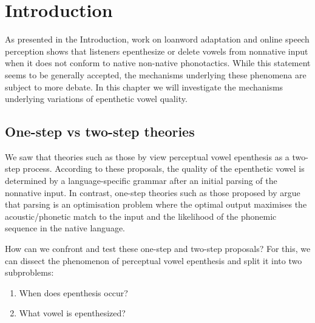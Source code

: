 

\section{Introduction}
As presented in the Introduction, work on loanword adaptation and online speech perception shows that listeners epenthesize or delete vowels from nonnative input when it does not conform to native non-native phonotactics.
While this statement seems to be generally accepted, the mechanisms underlying these phenomena are subject to more debate. In this chapter we will investigate the mechanisms underlying variations of epenthetic vowel quality. 


\subsection{One-step vs two-step theories}

We saw that theories such as those by \cite{berent2007, monahan2009} view perceptual vowel epenthesis as a two-step process.
According to these proposals, the quality of the epenthetic vowel is determined by a language-specific grammar after an initial parsing of the nonnative input.
In contrast, one-step theories such as those proposed by \cite{dupoux2011, wilson2013, durvasula2015} argue that parsing is an optimisation problem where the optimal output maximises the acoustic/phonetic match to the input and the likelihood of the phonemic sequence in the native language. 

How can we confront and test these one-step and two-step proposals? For this, we can dissect the phenomenon of perceptual vowel epenthesis and split it into two subproblems:
\begin{enumerate}
    \item When does epenthesis occur?
    \item What vowel is epenthesized?
\end{enumerate}
    

